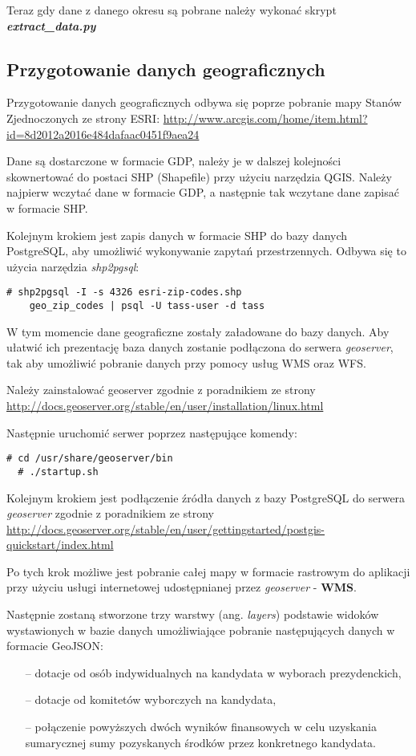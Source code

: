 \documentclass[10pt,a4paper]{article}
\begin{document}
\bigskip \noindent
Teraz gdy dane z danego okresu są pobrane należy wykonać skrypt \textit{\textbf{extract\_data.py}}

\subsection{Przygotowanie danych geograficznych}
\bigskip \noindent
Przygotowanie danych geograficznych odbywa się poprze pobranie mapy Stanów Zjednoczonych ze strony ESRI:
\url{http://www.arcgis.com/home/item.html?id=8d2012a2016e484dafaac0451f9aea24}

Dane są dostarczone w formacie GDP, należy je w dalszej kolejności skownertować do postaci SHP (Shapefile) przy użyciu narzędzia QGIS. Należy najpierw wczytać dane w formacie GDP, a następnie tak wczytane dane zapisać w formacie SHP.

Kolejnym krokiem jest zapis danych w formacie SHP do bazy danych PostgreSQL, aby umożliwić wykonywanie zapytań przestrzennych. Odbywa się to użycia narzędzia \textit{shp2pgsql}:
\bigskip \noindent
\begin{lstlisting}[style=BashInputStyle]
  # shp2pgsql -I -s 4326 esri-zip-codes.shp
  	geo_zip_codes | psql -U tass-user -d tass
\end{lstlisting}

W tym momencie dane geograficzne zostały załadowane do bazy danych. Aby ułatwić ich prezentację baza danych zostanie podłączona do serwera \textit{geoserver}, tak aby umożliwić pobranie danych przy pomocy usług WMS oraz WFS. 

Należy zainstalować geoserver zgodnie z poradnikiem ze strony \url{http://docs.geoserver.org/stable/en/user/installation/linux.html} 

Następnie uruchomić serwer poprzez następujące komendy:
\begin{lstlisting}[style=BashInputStyle]
  # cd /usr/share/geoserver/bin
  # ./startup.sh
\end{lstlisting}

Kolejnym krokiem jest podłączenie źródła danych z bazy PostgreSQL do serwera \textit{geoserver} zgodnie z poradnikiem ze strony \url{http://docs.geoserver.org/stable/en/user/gettingstarted/postgis-quickstart/index.html} 

Po tych krok możliwe jest pobranie całej mapy w formacie rastrowym do aplikacji przy użyciu usługi internetowej udostępnianej przez \textit{geoserver} - \textbf{WMS}.

Następnie zostaną stworzone trzy warstwy (ang. \textit{layers}) podstawie widoków wystawionych w bazie danych umożliwiające pobranie następujących danych w formacie GeoJSON:
\begin{itemize}
\item[--] dotacje od osób indywidualnych na kandydata w wyborach prezydenckich,
\item[--] dotacje od komitetów wyborczych na kandydata,
\item[--] połączenie powyższych dwóch wyników finansowych w celu uzyskania sumarycznej sumy pozyskanych środków przez konkretnego kandydata.
\end{itemize}
\end{document}
